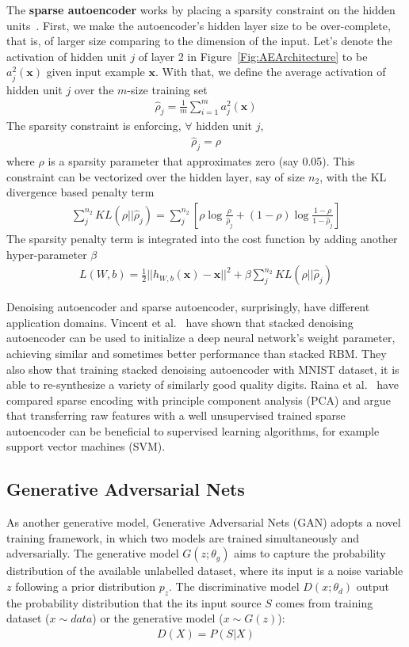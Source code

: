 The \textbf{sparse autoencoder} works by placing a sparsity constraint on the hidden units~\cite{SparseAE}.
First, we make the autoencoder's hidden layer size to be over-complete,
that is, of larger size comparing to the dimension of the input.
Let's denote the activation of hidden unit $j$ of layer 2 in Figure~\ref{Fig:AEArchitecture}
to be $a^2_j(\mathbf{x})$ given input example $\mathbf{x}$.
With that, we define the average activation of hidden unit $j$ over the $m$-size
training set
\begin{align}
    \hat{\rho}_j = \frac{1}{m} \sum_{i=1}^{m} a^2_j(\mathbf{x})
\end{align}
The sparsity constraint is enforcing, $\forall$ hidden unit $j$,
\begin{align}
    \hat{\rho}_j = \rho
\end{align}
where $\rho$ is a sparsity parameter that approximates zero (say 0.05).
This constraint can be vectorized over the hidden layer, say of size $n_2$,
with the KL divergence based penalty term
\begin{align}
    \sum_j^{n_2} KL(\rho || \hat{\rho}_j)
    = \sum_j^{n_2} [\rho \log \frac{\rho}{\hat{\rho}_j} + (1 - \rho) \log \frac{1-\rho}{1-\hat{\rho}_j} ]
\end{align}
The sparsity penalty term is integrated into the cost function by adding another hyper-parameter $\beta$
\begin{align}
    L(W, b) = \frac{1}{2}||h_{W,b}(\mathbf{x}) - \mathbf{x}||^2 +
    \beta \sum_j^{n_2} KL(\rho || \hat{\rho}_j)
\end{align}

Denoising autoencoder and sparse autoencoder, surprisingly, have different application domains.
Vincent et al.~\cite{DenoiseAE} have shown that stacked denoising autoencoder can be used to
initialize a deep neural network's weight parameter,
achieving similar and sometimes better performance than stacked RBM.
They also show that training stacked denoising autoencoder with MNIST dataset, it is able
to re-synthesize a variety of similarly good quality digits.
Raina et al.~\cite{SparseAE} have compared sparse encoding with principle component analysis
(PCA) and argue that transferring raw features with a well unsupervised trained
sparse autoencoder can be beneficial to supervised learning algorithms,
for example support vector machines (SVM).


\subsection{Generative Adversarial Nets}
As another generative model, Generative Adversarial Nets (GAN)\cite{GAN} adopts a novel training framework,
in which two models are trained simultaneously and adversarially.
The generative model $G(z;\theta_g)$ aims to capture the probability distribution of the available unlabelled dataset,
where its input is a noise variable $z$ following a prior distribution $p_z$.
The discriminative model $D(x;\theta_d)$ output the probability distribution that the its input source $S$ comes
from training dataset ($x\sim data$) or the generative model ($x \sim G(z)$):
\begin{align}
    D(X) = P(S|X)
\end{align}

